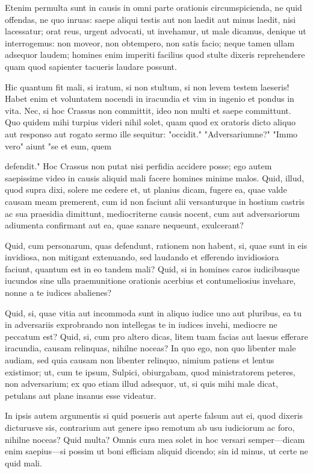  Etenim permulta sunt in causis in omni parte orationis circumspicienda, ne quid offendas, ne quo inruas: saepe aliqui testis aut non laedit aut minus laedit, nisi lacessatur; orat reus, urgent advocati, ut invehamur, ut male dicamus, denique ut interrogemus: non moveor, non obtempero, non satis facio; neque tamen ullam adsequor laudem; homines enim imperiti facilius quod stulte dixeris reprehendere quam quod sapienter tacueris laudare possunt.

 Hic quantum fit mali, si iratum, si non stultum, si non levem testem laeseris! Habet enim et voluntatem nocendi in iracundia et vim in ingenio et pondus in vita. Nec, si hoc Crassus non committit, ideo non multi et saepe committunt. Quo quidem mihi turpius videri nihil solet, quam quod ex oratoris dicto aliquo aut responso aut rogato sermo ille sequitur: "occidit." "Adversariumne?" "Immo vero" aiunt "se et eum, quem

 defendit." Hoc Crassus non putat nisi perfidia accidere posse; ego autem saepissime video in causis aliquid mali facere homines minime malos. Quid, illud, quod supra dixi, solere me cedere et, ut planius dicam, fugere ea, quae valde causam meam premerent, cum id non faciunt alii versanturque in hostium castris ac sua praesidia dimittunt, mediocriterne causis nocent, cum aut adversariorum adiumenta confirmant aut ea, quae sanare nequeunt, exulcerant?

 Quid, cum personarum, quas defendunt, rationem non habent, si, quae sunt in eis invidiosa, non mitigant extenuando, sed laudando et efferendo invidiosiora faciunt, quantum est in eo tandem mali? Quid, si in homines caros iudicibusque iucundos sine ulla praemunitione orationis acerbius et contumeliosius invehare, nonne a te iudices abalienes?

 Quid, si, quae vitia aut incommoda sunt in aliquo iudice uno aut pluribus, ea tu in adversariis exprobrando non intellegas te in iudices invehi, mediocre ne peccatum est? Quid, si, cum pro altero dicas, litem tuam facias aut laesus efferare iracundia, causam relinquas, nihilne noceas? In quo ego, non quo libenter male audiam, sed quia causam non libenter relinquo, nimium patiens et lentus existimor; ut, cum te ipsum, Sulpici, obiurgabam, quod ministratorem peteres, non adversarium; ex quo etiam illud adsequor, ut, si quis mihi male dicat, petulans aut plane insanus esse videatur.

 In ipsis autem argumentis si quid posueris aut aperte falsum aut ei, quod dixeris dicturusve sis, contrarium aut genere ipso remotum ab usu iudiciorum ac foro, nihilne noceas? Quid multa? Omnis cura mea solet in hoc versari semper—dicam enim saepius—si possim ut boni efficiam aliquid dicendo; sin id minus, ut certe ne quid mali.

